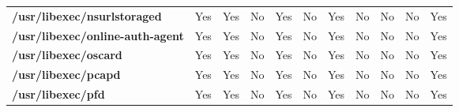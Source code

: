 \begin{center}
{\begin{tabular}{|>{\bfseries} l | C | C | C | C | C | C | C | C | C | C |}
					/usr/libexec/nsurlstoraged & Yes & Yes & \color{green}No & \color{red}Yes & \color{green}No & \color{red}Yes & No & No & \color{green}No & \color{red}Yes\\ 
					/usr/libexec/online-auth-agent & Yes & Yes & \color{green}No & \color{red}Yes & \color{green}No & \color{red}Yes & No & No & \color{green}No & \color{red}Yes\\ 
					/usr/libexec/oscard & Yes & Yes & \color{green}No & \color{red}Yes & \color{green}No & \color{red}Yes & No & No & \color{green}No & \color{red}Yes\\ 
					/usr/libexec/pcapd & Yes & Yes & \color{green}No & \color{red}Yes & \color{green}No & \color{red}Yes & No & No & \color{green}No & \color{red}Yes\\ 
					/usr/libexec/pfd & Yes & Yes & \color{green}No & \color{red}Yes & \color{green}No & \color{red}Yes & No & No & \color{green}No & \color{red}Yes\\ 

			\end{tabular}
		}
	\end{center}





